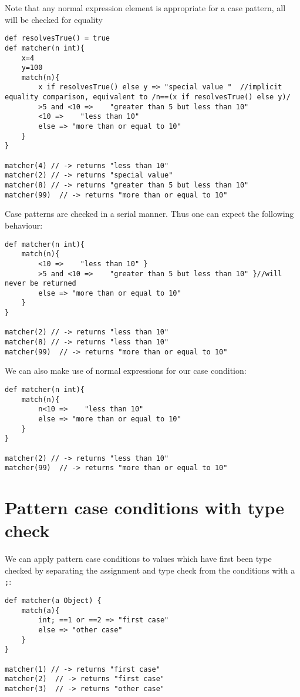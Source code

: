 \documentclass[conc-doc]{subfiles}
\begin{document}
Note that any normal expression element is appropriate for a case pattern, all will be checked for equality

\begin{lstlisting}
def resolvesTrue() = true
def matcher(n int){
	x=4
	y=100
	match(n){
		x if resolvesTrue() else y => "special value "  //implicit equality comparison, equivalent to /n==(x if resolvesTrue() else y)/
		>5 and <10 =>    "greater than 5 but less than 10" 
		<10 =>    "less than 10" 
		else => "more than or equal to 10" 
	}
}

matcher(4) // -> returns "less than 10"
matcher(2) // -> returns "special value"
matcher(8) // -> returns "greater than 5 but less than 10"
matcher(99)  // -> returns "more than or equal to 10"
\end{lstlisting}

Case patterns are checked in a serial manner. Thus one can expect the following behaviour:

\begin{lstlisting}
def matcher(n int){
	match(n){
		<10 =>    "less than 10" }
		>5 and <10 =>    "greater than 5 but less than 10" }//will never be returned
		else => "more than or equal to 10"
	}
}

matcher(2) // -> returns "less than 10"
matcher(8) // -> returns "less than 10"
matcher(99)  // -> returns "more than or equal to 10"
\end{lstlisting}

We can also make use of normal expressions for our case condition:

\begin{lstlisting}
def matcher(n int){
	match(n){
		n<10 =>    "less than 10" 
		else => "more than or equal to 10" 
	}
}

matcher(2) // -> returns "less than 10"
matcher(99)  // -> returns "more than or equal to 10"
\end{lstlisting}

\section{Pattern case conditions with type check}
We can apply pattern case conditions to values which have first been type checked by separating the assignment and type check from the conditions with a \lstinline{;}:
\begin{lstlisting}
def matcher(a Object) {
	match(a){
		int; ==1 or ==2 => "first case"
		else => "other case"
	}
}

matcher(1) // -> returns "first case"
matcher(2)  // -> returns "first case"
matcher(3)  // -> returns "other case"
\end{lstlisting}
\end{document}
